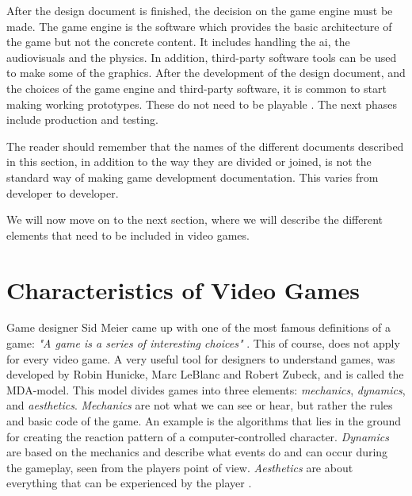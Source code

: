 After the design document is finished, the decision on the game engine must be made. The game engine is the software which provides the basic architecture of the game but not the concrete content. It includes handling the \ac{ai}, the audiovisuals and the physics. In addition, third-party software tools can be used to make some of the graphics. After the development of the design document, and the choices of the game engine and third-party software, it is common to start making working prototypes. These do not need to be playable \cite{understandingvg}. The next phases include production and testing. 

The reader should remember that the names of the different documents described in this section, in addition to the way they are divided or joined, is not the standard way of making game development documentation. This varies from developer to developer.

We will now move on to the next section, where we will describe the different elements that need to be included in video games.

\section{Characteristics of Video Games}
\label{sec:videogametheory}

Game designer Sid Meier came up with one of the most famous definitions of a game: \emph{"A game is a series of interesting choices"} \cite{understandingvg}. This of course, does not apply for every video game. A very useful tool for designers to understand games, was developed by Robin Hunicke, Marc LeBlanc and Robert Zubeck, and is called the MDA-model. This model divides games into three elements: \emph{mechanics}, \emph{dynamics}, and \emph{aesthetics}. \emph{Mechanics} are not what we can see or hear, but rather the rules and basic code of the game. An example is the algorithms that lies in the ground for creating the reaction pattern of a computer-controlled character. \emph{Dynamics} are based on the mechanics and describe what events do and can occur during the gameplay, seen from the players point of view. \emph{Aesthetics} are about everything that can be experienced by the player \cite{understandingvg}. 

